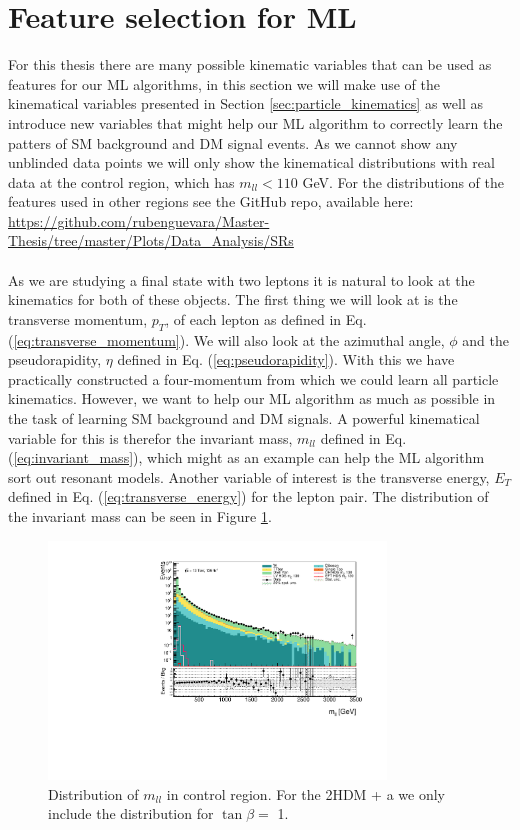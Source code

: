 \documentclass[12pt, a4paper]{book}
\begin{document}
\section{Feature selection for ML}
For this thesis there are many possible kinematic variables that can be used as features for our ML algorithms, in this section we will make use of the kinematical variables presented in Section \ref{sec:particle_kinematics} as well as introduce new variables that 
might help our ML algorithm to correctly learn the patters of SM background and DM signal events. As we cannot show any unblinded data points we will only show the kinematical distributions with real data at the control region, which has $m_{ll}<110$ GeV. For the 
distributions of the features used in other regions see the GitHub repo, available here: \href{https://github.com/rubenguevara/Master-Thesis/tree/master/Plots/Data_Analysis/SRs}{https://github.com/rubenguevara/Master-Thesis/tree/master/Plots/Data\_Analysis/SRs} \\
\\As we are studying a final state with two leptons it is natural to look at the kinematics for both of these objects. The first thing we will look at is the transverse momentum, $p_T$, of each lepton as defined in Eq. (\ref{eq:transverse_momentum}). 
We will also look at the azimuthal angle, $\phi$ and the pseudorapidity, $\eta$ defined in Eq. (\ref{eq:pseudorapidity}). 
With this we have practically constructed a four-momentum from which we could learn all particle kinematics. However, we want to help our ML algorithm as much as possible in the task of learning SM background and DM signals. A powerful kinematical variable for this is 
therefor the invariant mass, $m_{ll}$ defined in Eq. (\ref{eq:invariant_mass}), which might as an example can help the ML algorithm sort out resonant models. Another variable of interest is the transverse energy, $E_T$ defined in Eq. (\ref{eq:transverse_energy}) for the lepton pair. 
The distribution of the invariant mass can be seen in Figure \ref{fig:mll_dist}.\\
\graphicspath{{../../../Plots/Data_Analysis/SRs/Control_region/}} 
\begin{figure}[!ht]
    \centering
        \includegraphics[width=0.8\textwidth]{mll.pdf}
    \caption[Distribution of $m_{ll}$ in control region]{Distribution of $m_{ll}$ in control region.  For the 2HDM + a we only include the distribution for $\tan\beta=$ 1.}\label{fig:mll_dist}
\end{figure}
\end{document}
